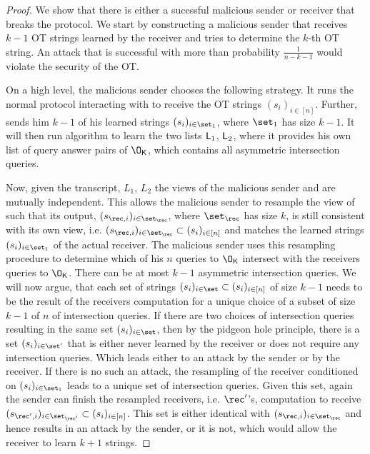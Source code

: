 \begin{proof}
We show that there is either a sucessful malicious sender or receiver that breaks the protocol. We start by constructing a malicious sender that receives $k-1$ OT strings learned by the receiver and tries to determine the $k$-th OT string. An attack that is successful with more than probability $\frac{1}{n-k-1}$ would violate the security of the OT. 

On a high level, the malicious sender chooses the following strategy. It runs the normal protocol interacting with \rec to receive the OT strings $(s_i)_{i\in[n]}$. Further, \rec sends him $k-1$ of his learned strings $(s_i)_{i\in\set_1}$, where $\set_1$ has size $k-1$. It will then run algorithm \E to learn the two lists $\mathsf{L}_1$, $\mathsf{L}_2$, where it provides \E his own list of query answer pairs of $\OK$, which contains all asymmetric intersection queries. 

Now, given the transcript, $L_1$, $L_2$ the views of the malicious sender and \rec are mutually independent. This allows the malicious sender to resample the view of \rec such that its output, $(s_{\rec,i})_{i\in\set_{\rec}}$, where $\set_{\rec}$ has size $k$, is still consistent with its own view, i.e. $(s_{\rec,i})_{i\in\set_{\rec}}\subset(s_i)_{i\in[n]}$ and matches the learned strings $(s_i)_{i\in\set_1}$ of the actual receiver. The malicious sender uses this resampling procedure to determine which of his $n$ queries to $\OK$ intersect with the receivers queries to $\OK$. There can be at most $k-1$ asymmetric intersection queries. We will now argue, that each set of strings $(s_i)_{i\in\set}\subset(s_i)_{i\in[n]}$ of size $k-1$ needs to be the result of the receivers computation for a unique choice of a subset of size $k-1$ of $n$ of intersection queries. If there are two choices of intersection queries resulting in the same set $(s_i)_{i\in\set}$, then by the pidgeon hole principle, there is a set $(s_i)_{i\in\set'}$ that is either never learned by the receiver or does not require any intersection queries. Which leads either to an attack by the sender or by the receiver. If there is no such an attack, the resampling of the receiver conditioned on $(s_i)_{i\in\set_1}$ leads to a unique set of intersection queries. Given this set, again the sender can finish the resampled receivers, i.e. $\rec'$'s, computation to receive $(s_{\rec',i})_{i\in\set_{\rec'}}\subset(s_i)_{i\in[n]}$. This set is either identical with $(s_{\rec,i})_{i\in\set_{\rec}}$ and hence results in an attack by the sender, or it is not, which would allow the receiver to learn $k+1$ strings.
\end{proof}